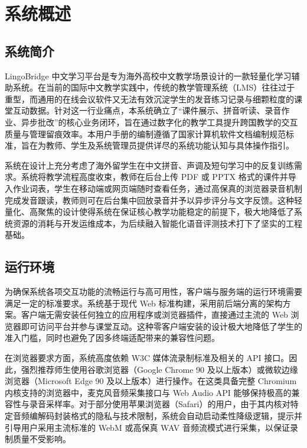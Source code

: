 \chapter{系统概述}

\section{系统简介}

LingoBridge 中文学习平台是专为海外高校中文教学场景设计的一款轻量化学习辅助系统。在当前的国际中文教学实践中，传统的教学管理系统（LMS）往往过于重型，而通用的在线会议软件又无法有效沉淀学生的发音练习记录与细颗粒度的课堂互动数据。针对这一行业痛点，本系统确立了“课件展示、拼音听读、录音作业、异步批改”的核心业务闭环，旨在通过数字化的教学工具提升跨国教学的交互质量与管理留痕效率。本用户手册的编制遵循了国家计算机软件文档编制规范标准\cite{gb8567}，旨在为教师、学生及系统管理员提供详尽的系统功能认知与具体操作指引。

系统在设计上充分考虑了海外留学生在中文拼音、声调及短句学习中的反复训练需求。系统将教学流程高度收束，教师在后台上传 PDF 或 PPTX 格式的课件并导入作业词表，学生在移动端或网页端随时查看任务，通过高保真的浏览器录音机制完成发音跟读，教师则可在后台集中回放录音并予以异步评分与文字反馈。这种轻量化、高聚焦的设计使得系统在保证核心教学功能稳定的前提下，极大地降低了系统资源的消耗与开发运维成本，为后续融入智能化语音评测技术打下了坚实的工程基础\cite{gb9385}。

\section{运行环境}

为确保系统各项交互功能的流畅运行与高可用性，客户端与服务端的运行环境需要满足一定的标准要求。系统基于现代 Web 标准构建，采用前后端分离的架构方案。客户端无需安装任何独立的应用程序或浏览器插件，直接通过主流的 Web 浏览器即可访问平台并参与课堂互动。这种零客户端安装的设计极大地降低了学生的准入门槛，同时也避免了因多终端适配带来的兼容性问题。

在浏览器要求方面，系统高度依赖 W3C 媒体流录制标准及相关的 API 接口。因此，强烈推荐师生使用谷歌浏览器（Google Chrome 90 及以上版本）或微软边缘浏览器（Microsoft Edge 90 及以上版本）进行操作。在这类具备完整 Chromium 内核支持的浏览器中，麦克风音频采集接口与 Web Audio API 能够保持极高的兼容性与录音采样率。对于部分使用苹果浏览器（Safari）的用户，由于其内核对特定音频编解码封装格式的隐私与技术限制，系统会自动启动柔性降级逻辑，提示并引导用户采用主流标准的 WebM 或高保真 WAV 音频流模式进行采集，以保证录制质量不受影响。

